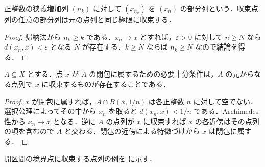 \begin{defn}[部分列]
正整数の狭義増加列 $(n_k)$ に対して $(x_{n_k})$ を $(x_n)$ の部分列という．収束点列の任意の部分列は元の点列と同じ極限に収束する．
\end{defn}
\begin{proof}
帰納法から $n_k\geq k$ である．$x_n\to x$ とすれば，$\varepsilon>0$ に対して $n\geq N$ なら $d(x_n,x)<\varepsilon$ となる $N$ が存在する．$k\geq N$ ならば $n_k\geq N$ なので結論を得る．
\end{proof}
\begin{prop}[閉包の点列による判定]
$A\subseteq X$ とする．点 $x$ が $A$ の閉包に属するための必要十分条件は，$A$ の元からなる点列で $x$ に収束するものが存在することである．
\end{prop}
\begin{proof}
$x$ が閉包に属すれば，$A\cap B(x,1/n)$ は各正整数 $n$ に対して空でない．選択公理によってその中から $x_n$ を取ると $d(x_n,x)<1/n$ である．Archimedes性から $x_n\to x$ となる．逆に $A$ の点列が $x$ に収束すれば $x$ の各近傍はその点列の項を含むので $A$ と交わる．閉包の近傍による特徴づけから $x$ は閉包に属する．
\end{proof}
開区間の境界点に収束する点列の例を  に示す．
